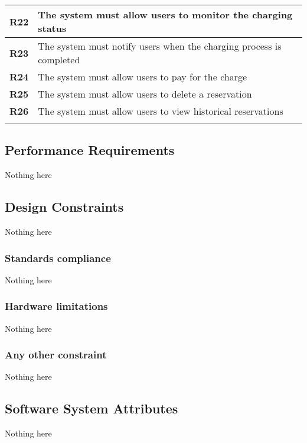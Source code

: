 \begin{table}[h]
\begin{tabular}{|l|l|}
        \textbf{R22} & The system must allow users to monitor the charging status                                                          \\ \midrule
        \textbf{R23} & The system must notify users when the charging process is completed                                                 \\ \midrule
        \textbf{R24} & The system must allow users to pay for the charge                                                                   \\ \midrule
        \textbf{R25} & The system must allow users to delete a reservation                                                                 \\ \midrule
        \textbf{R26} & The system must allow users to view historical reservations                                                         \\ \midrule
                     &                                                                                                                     \\ \bottomrule
    \end{tabular}
\end{table}

\subsection{Performance Requirements}
Nothing here

\subsection{Design Constraints}
Nothing here

\subsubsection{Standards compliance}
Nothing here

\subsubsection{Hardware limitations}
Nothing here

\subsubsection{Any other constraint}
Nothing here


\subsection{Software System Attributes}
Nothing here

